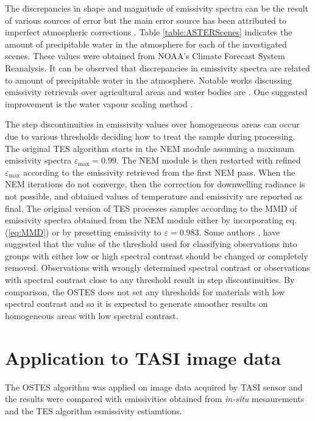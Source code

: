The discrepancies in shape and magnitude of emissivity spectra can be the result of various sources of error but the main error source has been attributed to imperfect atmospheric corrections \cite{TP01, TP05}. Table \ref{table:ASTERScenes} indicates the amount of precipitable water in the atmosphere for each of the investigated scenes. These values were obtained from NOAA's Climate Forecast System Reanalysis. It can be observed that discrepancies in emissivity spectra are related to amount of precipitable water in the atmosphere. Notable works discussing emissivity retrievals over agricultural areas and water bodies are \cite{CC07, SJ07}. One suggested improvement is the water vapour scaling method \cite{T05, GA11}.

The step discontinuities in emissivity values over homogeneous areas can occur due to various thresholds deciding how to treat the sample during processing. The original TES algorithm starts in the NEM module assuming a maximum emissivity spectra $\varepsilon_\mathrm{max}=0.99$. The NEM module is then restarted with refined $\varepsilon_\mathrm{max}$ according to the emissivity retrieved from the first NEM pass. When the NEM iterations do not converge, then the correction for downwelling radiance is not possible, and obtained values of temperature and emissivity are reported as final. The original version of TES processes samples according to the MMD of emissivity spectra obtained from the NEM module either by incorporating eq. (\ref{eq:MMD}) or by presetting emissivity to $\varepsilon = 0.983$. Some authors \cite{GG06}, \cite{SG09} have suggested that the value of the threshold used for classifying observations into groups with either low or high spectral contrast should be changed or completely removed. Observations with wrongly determined spectral contrast or observations with spectral contrast close to any threshold result in step discontinuities. By comparison, the OSTES does not set any thresholds for materials with low spectral contrast and so it is expected to generate smoother results on homogeneous areas with low spectral contrast.

\section{Application to TASI image data}

The OSTES algorithm was applied on image data acquired by TASI sensor and the results were compared with emissivities obtained from \textit{in-situ} mesaurements and the TES algorithm esmissivity estiamtions. 

